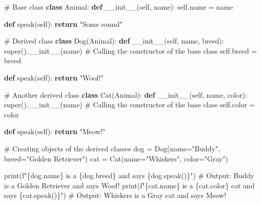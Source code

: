 \documentclass[
  letterpaper,
  DIV=11,
  numbers=noendperiod]{scrreprt}
\newenvironment{Shaded}{\begin{snugshade}}{\end{snugshade}}
\newcommand{\BuiltInTok}[1]{\textcolor[rgb]{0.00,0.23,0.31}{#1}}
\newcommand{\CommentTok}[1]{\textcolor[rgb]{0.37,0.37,0.37}{#1}}
\newcommand{\ControlFlowTok}[1]{\textcolor[rgb]{0.00,0.23,0.31}{\textbf{#1}}}
\newcommand{\FunctionTok}[1]{\textcolor[rgb]{0.28,0.35,0.67}{#1}}
\newcommand{\KeywordTok}[1]{\textcolor[rgb]{0.00,0.23,0.31}{\textbf{#1}}}
\newcommand{\NormalTok}[1]{\textcolor[rgb]{0.00,0.23,0.31}{#1}}
\newcommand{\OperatorTok}[1]{\textcolor[rgb]{0.37,0.37,0.37}{#1}}
\newcommand{\SpecialCharTok}[1]{\textcolor[rgb]{0.37,0.37,0.37}{#1}}
\newcommand{\SpecialStringTok}[1]{\textcolor[rgb]{0.13,0.47,0.30}{#1}}
\newcommand{\StringTok}[1]{\textcolor[rgb]{0.13,0.47,0.30}{#1}}
\newcommand{\VariableTok}[1]{\textcolor[rgb]{0.07,0.07,0.07}{#1}}
\theoremstyle{plain}
\theoremstyle{definition}
\theoremstyle{remark}
\begin{document}
\begin{Shaded}
\begin{Highlighting}[]
\CommentTok{\# Base class}
\KeywordTok{class}\NormalTok{ Animal:}
    \KeywordTok{def} \FunctionTok{\_\_init\_\_}\NormalTok{(}\VariableTok{self}\NormalTok{, name):}
        \VariableTok{self}\NormalTok{.name }\OperatorTok{=}\NormalTok{ name}
    
    \KeywordTok{def}\NormalTok{ speak(}\VariableTok{self}\NormalTok{):}
        \ControlFlowTok{return} \StringTok{"Some sound"}

\CommentTok{\# Derived class}
\KeywordTok{class}\NormalTok{ Dog(Animal):}
    \KeywordTok{def} \FunctionTok{\_\_init\_\_}\NormalTok{(}\VariableTok{self}\NormalTok{, name, breed):}
        \BuiltInTok{super}\NormalTok{().}\FunctionTok{\_\_init\_\_}\NormalTok{(name)  }\CommentTok{\# Calling the constructor of the base class}
        \VariableTok{self}\NormalTok{.breed }\OperatorTok{=}\NormalTok{ breed}
    
    \KeywordTok{def}\NormalTok{ speak(}\VariableTok{self}\NormalTok{):}
        \ControlFlowTok{return} \StringTok{"Woof!"}

\CommentTok{\# Another derived class}
\KeywordTok{class}\NormalTok{ Cat(Animal):}
    \KeywordTok{def} \FunctionTok{\_\_init\_\_}\NormalTok{(}\VariableTok{self}\NormalTok{, name, color):}
        \BuiltInTok{super}\NormalTok{().}\FunctionTok{\_\_init\_\_}\NormalTok{(name)  }\CommentTok{\# Calling the constructor of the base class}
        \VariableTok{self}\NormalTok{.color }\OperatorTok{=}\NormalTok{ color}
    
    \KeywordTok{def}\NormalTok{ speak(}\VariableTok{self}\NormalTok{):}
        \ControlFlowTok{return} \StringTok{"Meow!"}

\CommentTok{\# Creating objects of the derived classes}
\NormalTok{dog }\OperatorTok{=}\NormalTok{ Dog(name}\OperatorTok{=}\StringTok{"Buddy"}\NormalTok{, breed}\OperatorTok{=}\StringTok{"Golden Retriever"}\NormalTok{)}
\NormalTok{cat }\OperatorTok{=}\NormalTok{ Cat(name}\OperatorTok{=}\StringTok{"Whiskers"}\NormalTok{, color}\OperatorTok{=}\StringTok{"Gray"}\NormalTok{)}

\BuiltInTok{print}\NormalTok{(}\SpecialStringTok{f"}\SpecialCharTok{\{}\NormalTok{dog}\SpecialCharTok{.}\NormalTok{name}\SpecialCharTok{\}}\SpecialStringTok{ is a }\SpecialCharTok{\{}\NormalTok{dog}\SpecialCharTok{.}\NormalTok{breed}\SpecialCharTok{\}}\SpecialStringTok{ and says }\SpecialCharTok{\{}\NormalTok{dog}\SpecialCharTok{.}\NormalTok{speak()}\SpecialCharTok{\}}\SpecialStringTok{"}\NormalTok{)  }\CommentTok{\# Output: Buddy is a Golden Retriever and says Woof!}
\BuiltInTok{print}\NormalTok{(}\SpecialStringTok{f"}\SpecialCharTok{\{}\NormalTok{cat}\SpecialCharTok{.}\NormalTok{name}\SpecialCharTok{\}}\SpecialStringTok{ is a }\SpecialCharTok{\{}\NormalTok{cat}\SpecialCharTok{.}\NormalTok{color}\SpecialCharTok{\}}\SpecialStringTok{ cat and says }\SpecialCharTok{\{}\NormalTok{cat}\SpecialCharTok{.}\NormalTok{speak()}\SpecialCharTok{\}}\SpecialStringTok{"}\NormalTok{)  }\CommentTok{\# Output: Whiskers is a Gray cat and says Meow!}
\end{Highlighting}
\end{Shaded}
\end{document}
